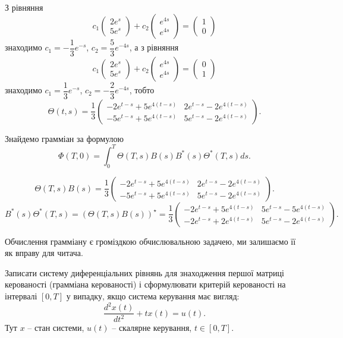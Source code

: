 \begin{solution}
    З рівняння
    \[ c_1 \begin{pmatrix} 2e^s \\ 5e^s \end{pmatrix} + c_2 \begin{pmatrix} e^{4s} \\ e^{4s} \end{pmatrix} = \begin{pmatrix} 1 \\ 0 \end{pmatrix} \]
    знаходимо $c_1 = -\dfrac13 e^{-s}$, $c_2 = \dfrac53 e^{-4s}$, а з рівняння
    \[ c_1 \begin{pmatrix} 2e^s \\ 5e^s \end{pmatrix} + c_2 \begin{pmatrix} e^{4s} \\ e^{4s} \end{pmatrix} = \begin{pmatrix} 0 \\ 1 \end{pmatrix} \]
    знаходимо $c_1 = \dfrac13 e^{-s}$, $c_2 = -\dfrac23 e^{-4s}$, тобто
    \[ \Theta(t, s) = \dfrac13\begin{pmatrix} -2 e^{t-s} + 5 e^{4(t-s)} & 2 e^{t-s} - 2 e^{4(t-s)} \\ -5 e^{t-s} + 5 e^{4(t-s)} & 5 e^{t-s} - 2 e^{4(t-s)} \end{pmatrix}. \]
    
    Знайдемо грамміан за формулою \[\Phi(T, 0) = \int_0^T \Theta(T, s) B(s) B^* (s) \Theta^*(T, s) ds. \]
    
    \[ \Theta(T, s) B(s) =  \dfrac13\begin{pmatrix} -2 e^{t-s} + 5 e^{4(t-s)} & 2 e^{t-s} - 2 e^{4(t-s)} \\ -5 e^{t-s} + 5 e^{4(t-s)} & 5 e^{t-s} - 2 e^{4(t-s)} \end{pmatrix}. \]
    \[ B^* (s) \Theta^*(T, s)  =  (\Theta(T, s) B(s))^\star =  \dfrac13\begin{pmatrix} -2 e^{t-s} + 5 e^{4(t-s)} & 5 e^{t-s} - 5 e^{4(t-s)} \\ -2 e^{t-s} + 2 e^{4(t-s)} & 5 e^{t-s} - 2 e^{4(t-s)} \end{pmatrix}. \]
    
    Обчислення грамміану є громіздкою обчислювальною задачею, ми залишаємо її як вправу для читача.
\end{solution}

\begin{problem}
    Записати систему диференціальних рівнянь для знаходження першої матриці керованості (грамміана керованості) і сформулювати критерій керованості на інтервалі $[0, T]$ у випадку, якщо система керування має вигляд:
    \[ \dfrac{d^2x(t)}{dt^2} + tx(t) = u(t). \]
    Тут $x$ -- стан системи, $u(t)$ -- скалярне керування, $t \in [0, T]$.
\end{problem}

